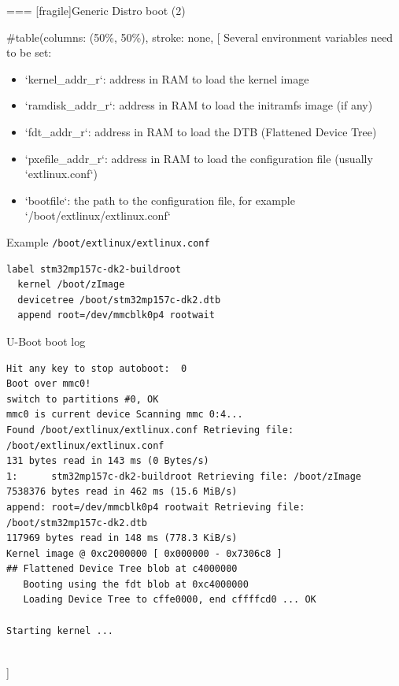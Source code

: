=== [fragile]{Generic Distro boot (2)}
  
#table(columns: (50\%, 50\%), stroke: none,
[
  \small
  Several environment variables need to be set:
  \begin{itemize}
     \item `kernel_addr_r`: address in RAM to load the kernel image
     \item `ramdisk_addr_r`: address in RAM to load the initramfs image (if any)
     \item `fdt_addr_r`: address in RAM to load the DTB (Flattened
           Device Tree)
     \item `pxefile_addr_r`: address in RAM to load the
           configuration file (usually `extlinux.conf`)
     \item `bootfile`: the path to the configuration file,
           for example `/boot/extlinux/extlinux.conf`
  \end{itemize}
  \begin{block}{Example {\tt /boot/extlinux/extlinux.conf}}
    {\tiny
\begin{verbatim}
label stm32mp157c-dk2-buildroot
  kernel /boot/zImage
  devicetree /boot/stm32mp157c-dk2.dtb
  append root=/dev/mmcblk0p4 rootwait
\end{verbatim}
    }
  \end{block}

  \begin{block}{U-Boot boot log}
    {\tiny
\begin{verbatim}
Hit any key to stop autoboot:  0
Boot over mmc0!
switch to partitions #0, OK
mmc0 is current device Scanning mmc 0:4...
Found /boot/extlinux/extlinux.conf Retrieving file: /boot/extlinux/extlinux.conf
131 bytes read in 143 ms (0 Bytes/s)
1:      stm32mp157c-dk2-buildroot Retrieving file: /boot/zImage
7538376 bytes read in 462 ms (15.6 MiB/s)
append: root=/dev/mmcblk0p4 rootwait Retrieving file: /boot/stm32mp157c-dk2.dtb
117969 bytes read in 148 ms (778.3 KiB/s)
Kernel image @ 0xc2000000 [ 0x000000 - 0x7306c8 ]
## Flattened Device Tree blob at c4000000
   Booting using the fdt blob at 0xc4000000
   Loading Device Tree to cffe0000, end cffffcd0 ... OK

Starting kernel ...
\end{verbatim}
    }
  \end{block}
  \\]

